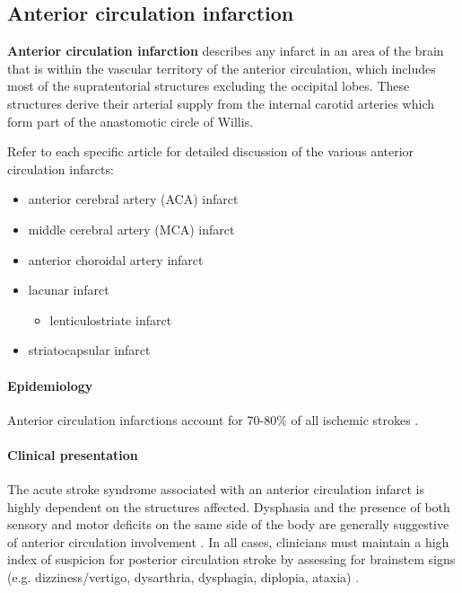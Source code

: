 \subsection{Anterior circulation infarction}

\textbf{Anterior circulation infarction} describes any infarct in an area of the brain that is within the vascular territory of the anterior circulation, which includes most of the supratentorial structures excluding the occipital lobes. These structures derive their arterial supply from the internal carotid arteries which form part of the anastomotic circle of Willis.

Refer to each specific article for detailed discussion of the various anterior circulation infarcts:

\begin{itemize}
	\item
	anterior cerebral artery (ACA) infarct
	\item
	middle cerebral artery (MCA) infarct
	\item
	anterior choroidal artery infarct
	\item
	lacunar infarct
	
	\begin{itemize}
		\item
		lenticulostriate infarct
	\end{itemize}
	\item
	striatocapsular infarct
\end{itemize}

\paragraph{Epidemiology}

Anterior circulation infarctions account for 70-80\% of all ischemic strokes .

\paragraph{Clinical presentation}

The acute stroke syndrome associated with an anterior circulation infarct is highly dependent on the structures affected. Dysphasia and the presence of both sensory and motor deficits on the same side of the body are generally suggestive of anterior circulation involvement . In all cases, clinicians must maintain a high index of suspicion for posterior circulation stroke by assessing for brainstem signs (e.g. dizziness/vertigo, dysarthria, dysphagia, diplopia, ataxia) .


